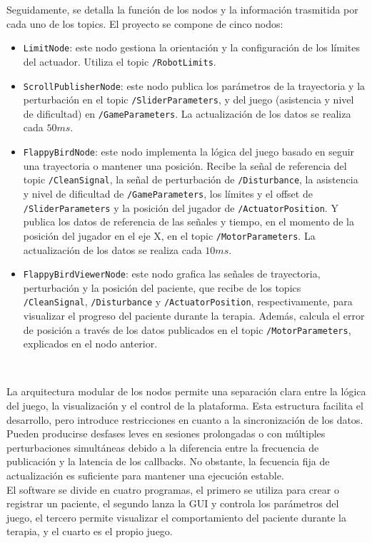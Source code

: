 Seguidamente, se detalla la función de los nodos y la información trasmitida por cada uno de los topics.
El proyecto se compone de cinco nodos:
\begin{itemize}
    \item \verb|LimitNode|: este nodo gestiona la orientación y la configuración de los límites del actuador. Utiliza el topic \verb|/RobotLimits|.
	\item \verb|ScrollPublisherNode|: este nodo publica los parámetros de la trayectoria y la perturbación en el topic \verb|/SliderParameters|, y del juego (asistencia y nivel de dificultad) en \verb|/GameParameters|. La actualización de los datos se realiza cada $50 ms$.
	\item \verb|FlappyBirdNode|: este nodo implementa la lógica del juego basado en seguir una trayectoria o mantener una posición. Recibe la señal de referencia del topic \verb|/CleanSignal|, la señal de perturbación de \verb|/Disturbance|, la asistencia y nivel de dificultad de \verb|/GameParameters|, los límites y el offset de \verb|/SliderParameters| y la posición del jugador de \verb|/ActuatorPosition|. Y publica los datos de referencia de las señales y tiempo, en el momento de la posición del jugador en el eje X, en el topic \verb|/MotorParameters|. La actualización de los datos se realiza cada $10 ms$.
	\item \verb|FlappyBirdViewerNode|: este nodo grafica las señales de trayectoria, perturbación y la posición del paciente, que recibe de los topics \verb|/CleanSignal|, \verb|/Disturbance| y \verb|/ActuatorPosition|, respectivamente, para visualizar el progreso del paciente durante la terapia. Además, calcula el error de posición a través de los datos publicados en el topic \verb|/MotorParameters|, explicados en el nodo anterior.
\end{itemize}\

La arquitectura modular de los nodos permite una separación clara entre la lógica del juego, la visualización y el control de la plataforma.
Esta estructura facilita el desarrollo, pero introduce restricciones en cuanto a la sincronización de los datos.
Pueden producirse desfases leves en sesiones prolongadas o con múltiples perturbaciones simultáneas debido a la diferencia entre la frecuencia de publicación y la latencia de los callbacks.
No obstante, la fecuencia fija de actualización es suficiente para mantener una ejecución estable.\\

El software se divide en cuatro programas, el primero se utiliza para crear o registrar un paciente, el segundo lanza la GUI y controla los parámetros del juego, el tercero permite visualizar el comportamiento del paciente durante la terapia, y el cuarto es el propio juego.

